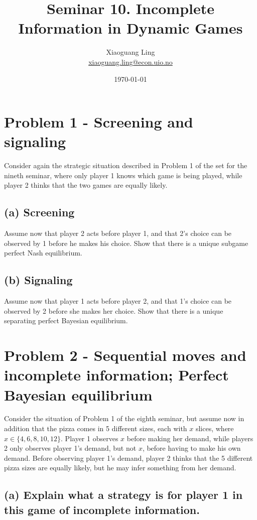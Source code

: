 \documentclass{article}
\title{Seminar 10. Incomplete Information in Dynamic Games}
\author{Xiaoguang Ling \\  \href{xiaoguang.ling@econ.uio.no}{xiaoguang.ling@econ.uio.no}}
\date{\today}
\begin{document}
\maketitle

\section{Problem 1 - Screening and signaling}

Consider again the strategic situation described in Problem 1 of the set for the nineth seminar, where only player 1 knows which game is being played, while player 2 thinks that the two games are equally likely.
\subsection{(a) Screening} Assume now that player 2 acts before player 1, and that 2's choice can be observed by 1 before he makes his choice. Show that there is a unique subgame perfect Nash equilibrium. 
\subsection{(b) Signaling} Assume now that player 1 acts before player 2, and that 1's choice can be observed by 2 before she makes her choice. Show that there is a unique separating perfect Bayesian equilibrium.

\bigskip

\section{Problem 2 - Sequential moves and incomplete information; Perfect
Bayesian equilibrium}

Consider the situation of Problem 1 of the eighth seminar, but assume now in addition that the pizza comes in 5
different sizes, each with $x$ slices, where $x \in \{4, 6, 8, 10, 12\}$. Player 1 observes $x$
before making her demand, while players 2 only observes player 1's demand, but not $x$, before
having to make his own demand. Before observing player 1's demand, player 2 thinks that the 5
different pizza sizes are equally likely, but he may infer something from her demand.
%

%
\subsection{(a) Explain what a strategy is for player 1 in this game of incomplete information.} 
%
\end{document}
